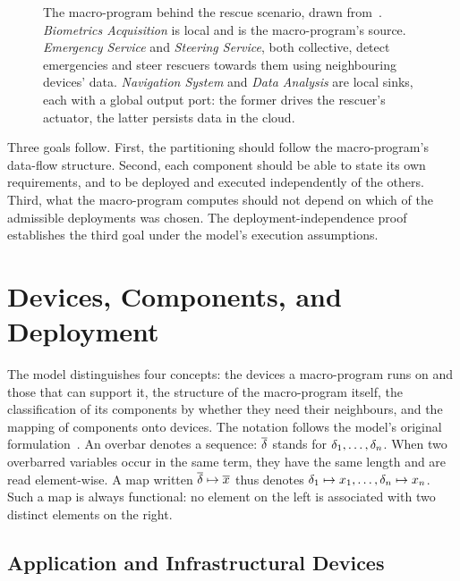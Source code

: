 \begin{figure}[t]
    \centering
    
    \caption[The rescue case study as a five-component macro-program]{The macro-program behind the rescue scenario, drawn from~\cite{DBLP:conf/acsos/FarabegoliVC24}. \emph{Biometrics Acquisition} is local and is the macro-program's source. \emph{Emergency Service} and \emph{Steering Service}, both collective, detect emergencies and steer rescuers towards them using neighbouring devices' data. \emph{Navigation System} and \emph{Data Analysis} are local sinks, each with a global output port: the former drives the rescuer's actuator, the latter persists data in the cloud.}
    \label{fig:rescue-case-study}
\end{figure}

Three goals follow.
First, the partitioning should follow the macro-program's data-flow structure.
Second, each component should be able to state its own requirements,
and to be deployed and executed independently of the others.
Third, what the macro-program computes should not depend on which of the admissible deployments was chosen.
%
The deployment-independence proof establishes the third goal under the model's execution assumptions.

\section{Devices, Components, and Deployment}
\label{sec:pulverization-abstractions}

The model distinguishes four concepts:
the devices a macro-program runs on and those that can support it,
the structure of the macro-program itself,
the classification of its components by whether they need their neighbours,
and the mapping of components onto devices.
%
The notation follows the model's original formulation~\cite{DBLP:conf/acsos/FarabegoliVC24}.
An overbar denotes a sequence:
$\overline{\delta}$ stands for $\delta_1,\dots,\delta_n$.
When two overbarred variables occur in the same term, they have the same length and are read element-wise.
A map written $\overline{\delta}\mapsto \overline{x}$ thus denotes $\delta_1\mapsto x_1,\dots,\delta_n\mapsto x_n$.
Such a map is always functional: no element on the left is associated with two distinct elements on the right.

\subsection{Application and Infrastructural Devices}
\label{subsec:application-infrastructural-devices}


